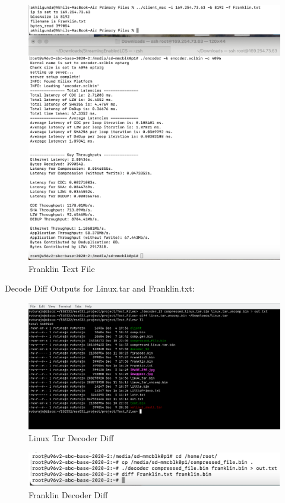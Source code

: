 \documentclass[../main.tex]{subfiles}
\begin{document}
\begin{enumerate}
        \begin{figure}[H]
            \centering
            \includegraphics[width=0.63\linewidth]{Images/image22.png}
            \caption{Franklin Text File}
            \label{fig:franklin}
        \end{figure}
        
        Decode Diff Outputs for Linux.tar and Franklin.txt:
        \begin{figure}[H]
            \centering
            \includegraphics[width=0.63\linewidth]{Images/image27.png}
            \caption{Linux Tar Decoder Diff}
            \label{fig:linux_tar_diff}
        \end{figure}
        
        \begin{figure}[H]
            \centering
            \includegraphics[width=0.7\linewidth]{Images/image28.png}
            \caption{Franklin Decoder Diff}
            \label{fig:franklin_diff}
        \end{figure}

    \vspace{1cm}


\end{enumerate}
\end{document}
